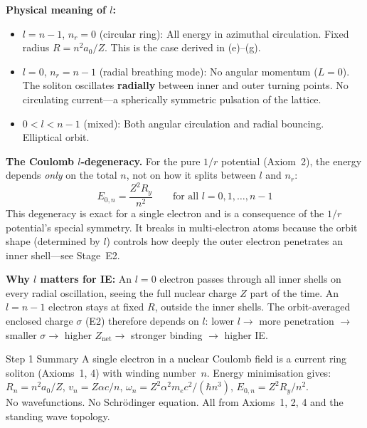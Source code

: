 \noindent\textbf{Physical meaning of $l$:}
\begin{itemize}
    \item $l = n - 1$, $n_r = 0$ (circular ring):
          All energy in azimuthal circulation.
          Fixed radius $R = n^2 a_0 / Z$.
          This is the case derived in (e)--(g).
    \item $l = 0$, $n_r = n - 1$ (radial breathing mode):
          No angular momentum ($L = 0$).
          The soliton oscillates \textbf{radially}
          between inner and outer turning points.
          No circulating current---a spherically
          symmetric pulsation of the lattice.
    \item $0 < l < n-1$ (mixed):
          Both angular circulation and radial
          bouncing.  Elliptical orbit.
\end{itemize}

\noindent\textbf{The Coulomb $l$-degeneracy.}
For the pure $1/r$ potential (Axiom~2), the energy
depends \emph{only} on the total $n$, not on how it
splits between $l$ and $n_r$:
\begin{equation}
    E_{0,n} = \frac{Z^2 R_y}{n^2}
    \qquad\text{for all $l = 0, 1, \ldots, n{-}1$}
    \label{eq:l_degeneracy}
\end{equation}
This degeneracy is exact for a single electron
and is a consequence of the $1/r$ potential's
special symmetry.  It breaks in multi-electron
atoms because the orbit shape (determined by $l$)
controls how deeply the outer electron
penetrates an inner shell---see Stage~E2.

\noindent\textbf{Why $l$ matters for IE:}
An $l = 0$ electron passes through all inner
shells on every radial oscillation, seeing the
full nuclear charge $Z$ part of the time.
An $l = n{-}1$ electron stays at fixed $R$,
outside the inner shells.  The orbit-averaged
enclosed charge $\sigma$ (E2) therefore depends
on $l$: lower $l \to$ more penetration $\to$
smaller $\sigma \to$ higher $Z_{\text{net}} \to$
stronger binding $\to$ higher IE.

\begin{resultbox}{Step 1 Summary}
A single electron in a nuclear Coulomb field is a
current ring soliton (Axioms~1, 4) with winding
number~$n$.  Energy minimisation gives:\\
$R_n = n^2 a_0 / Z$, \quad
$v_n = Z\alpha c / n$, \quad
$\omega_n = Z^2 \alpha^2 m_e c^2 / (\hbar n^3)$, \quad
$E_{0,n} = Z^2 R_y / n^2$.\\
No wavefunctions.  No Schr\"odinger equation.
All from Axioms~1, 2, 4 and the standing wave topology.
\end{resultbox}

